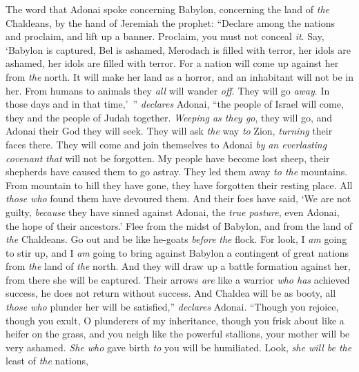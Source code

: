 \begin{biblechapter} %
 The word that Adonai spoke concerning Babylon, concerning the land of \textit{the} Chaldeans, by the hand of Jeremiah the prophet:
\verse “Declare among the nations and proclaim, 
and lift up a banner. 
Proclaim, you must not conceal \textit{it}. 
Say, ‘Babylon is captured, 
Bel is ashamed, 
Merodach is filled with terror, 
her idols are ashamed, 
her idols are filled with terror.
\verse For a nation will come up against her from \textit{the} north. 
It will make her land as a horror, 
and an inhabitant will not be in her. 
From humans to animals they \textit{all} will wander \textit{off}. 
They will go \textit{away}.
\verse In those days and in that time,’ ” \textit{declares} Adonai, 
“the people of Israel will come, 
they and the people of Judah together. 
\textit{Weeping as they go}, they will go, 
and Adonai their God they will seek.
\verse They will ask \textit{the} way \textit{to} Zion, 
\textit{turning} their faces there. 
They will come and join themselves to Adonai 
\textit{by} \textit{an everlasting covenant} \textit{that} will not be forgotten.
\verse My people have become lost sheep, 
their shepherds have caused them to go astray. 
They led them away \textit{to the} mountains. 
From mountain to hill they have gone, 
they have forgotten their resting place.
\verse All \textit{those who} found them have devoured them. 
And their foes have said, ‘We are not guilty, 
\textit{because} they have sinned against Adonai, the \textit{true pasture}, 
even Adonai, the hope of their ancestors.’
\verse Flee from the midst of Babylon, 
and from the land of \textit{the} Chaldeans. 
Go out and be like he-goats 
\textit{before} \textit{the} flock.
\verse For look, I \textit{am} going to stir up, 
and I \textit{am} going to bring against Babylon 
a contingent of great nations 
from \textit{the} land of \textit{the} north. 
And they will draw up a battle formation against her, 
from there she will be captured. 
Their arrows \textit{are} like a warrior \textit{who has} achieved success, 
he does not return without success.
\verse And Chaldea will be as booty, 
all \textit{those who} plunder her will be satisfied,” \textit{declares} Adonai.
\verse “Though you rejoice, though you exult, 
O plunderers of my inheritance, 
though you frisk about like a heifer on the grass, 
and you neigh like the powerful stallions,
\verse your mother will be very ashamed. 
\textit{She who} gave birth \textit{to} you will be humiliated. 
Look, \textit{she will be the} least of \textit{the} nations, 

\end{biblechapter}
